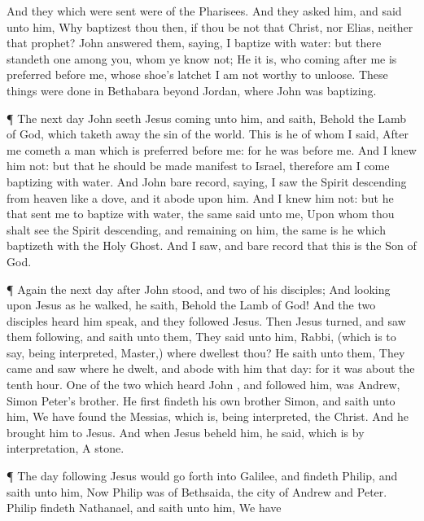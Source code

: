 {And
they which were
sent
were
of the
Pharisees.
And they
asked
him,
and
said unto
him,
Why baptizest
thou
then,
if
thou
be
not that
Christ,
nor
Elias,
neither that
prophet?
John
answered
them,
saying,
I
baptize
with
water:
but there
standeth one
among
you,
whom
ye
know
not;
He it
is,
who
coming
after
me is
preferred
before
me,
whose
shoe’s
latchet
I
am
not
worthy to
unloose.
These
things were
done
in
Bethabara
beyond
Jordan,
where
John
was
baptizing.
\par }{\PP {}¶ The next
day
John
seeth
Jesus
coming
unto
him,
and
saith,
Behold the
Lamb of
God,
which taketh
away the
sin of the
world.
This
is he
of
whom
I
said,
After
me
cometh a
man
which is
preferred
before
me:
for he
was
before
me.
And
I
knew
him
not:
but
that he should be made
manifest to
Israel,
therefore
am
I
come
baptizing
with
water.
And
John bare
record,
saying, I
saw the
Spirit
descending
from
heaven
like a
dove,
and it
abode
upon
him.
And I
knew
him
not:
but
he that
sent
me to
baptize
with
water, the
same
said unto
me,
Upon
whom thou shalt
see the
Spirit
descending,
and
remaining
on
him, the
same
is
he which
baptizeth
with
the
Holy
Ghost.
And I
saw,
and bare
record
that
this
is the
Son of
God.
\par }{\PP {}¶
Again the next
day
after
John
stood,
and
two
of
his
disciples;
And
looking upon
Jesus as he
walked, he
saith,
Behold the
Lamb of
God!
And the
two
disciples
heard
him
speak,
and they
followed
Jesus.
Then
Jesus
turned,
and
saw
them
following, and
saith unto
them,
{} They
said unto
him,
Rabbi, (which is to
say, being
interpreted,
Master,)
where dwellest
thou?
He
saith unto
them,
{} They
came
and
saw
where he
dwelt,
and
abode
with
him
that
day:
for it
was
about the
tenth
hour.
One
of the
two
which
heard
John
{},
and
followed
him,
was
Andrew,
Simon
Peter’s
brother.
He
first
findeth his
own
brother
Simon,
and
saith unto
him, We have
found the
Messias,
which
is, being
interpreted, the
Christ.
And he
brought
him
to
Jesus.
And
when
Jesus
beheld
him, he
said,
{}
which is by
interpretation, A
stone.
\par }{\PP {}¶ The day
following
Jesus
would go
forth
into
Galilee,
and
findeth
Philip,
and
saith unto
him,
{}
Now
Philip
was
of
Bethsaida, the
city of
Andrew
and
Peter.
Philip
findeth
Nathanael,
and
saith unto
him, We have
}
